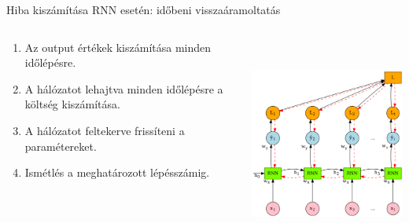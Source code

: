 \documentclass[english, aspectratio=169]{beamer}
\begin{document}
\begin{frame}{Hiba kiszámítása RNN esetén: időbeni visszaáramoltatás}
\begin{columns}
\begin{column}{.5\textwidth}
\begin{enumerate}
	\item Az output értékek kiszámítása minden időlépésre. 
	\item A hálózatot lehajtva minden időlépésre a költség kiszámítása.
	\item A hálózatot feltekerve frissíteni a paramétereket. 
	\item Ismétlés a meghatározott lépésszámig.
\end{enumerate}
\end{column}
\begin{column}{.5\textwidth}
\begin{center}
\includegraphics[height=7cm, width=7cm, keepaspectratio]{graphs/recurrent_11.png}
\end{center}
\end{column}
\end{columns}
\end{frame}
\end{document}
